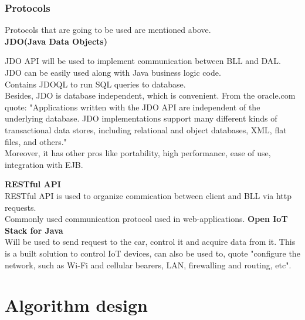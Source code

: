 \documentclass[12pt, letterpaper]{article}
\begin{document}
\subsubsection{Protocols}

Protocols that are going to be used are mentioned above. \\

\vspace{0.5cm}
\textbf{JDO(Java Data Objects)} \\
\vspace{0.5cm}

JDO API will be used to implement communication between BLL and DAL. JDO can be easily used along with Java business logic code. \\
Contains JDOQL to run SQL queries to database. \\
Besides, JDO is database independent, which is convenient. From the oracle.com quote: "Applications written with the JDO API are independent of the underlying database. JDO implementations support many different kinds of transactional data stores, including relational and object databases, XML, flat files, and others." \\
Moreover, it has other pros like portability, high performance, ease of use, integration with EJB.

\vspace{0.5cm}
\textbf{RESTful API} \\
\vspace{0.5cm}
RESTful API is used to organize commication between client and BLL via http requests. \\
Commonly used communication protocol used in web-applications.
\vspace{0.5cm}
\textbf{Open IoT Stack for Java} \\
\vspace{0.5cm}
Will be used to send request to the car, control it and acquire data from it. This is a built solution to control IoT devices, can also be used to, quote "configure the network, such as Wi-Fi and cellular bearers, LAN, firewalling and routing, etc".


\section{Algorithm design}
\label{sub:alg_des}
\end{document}
